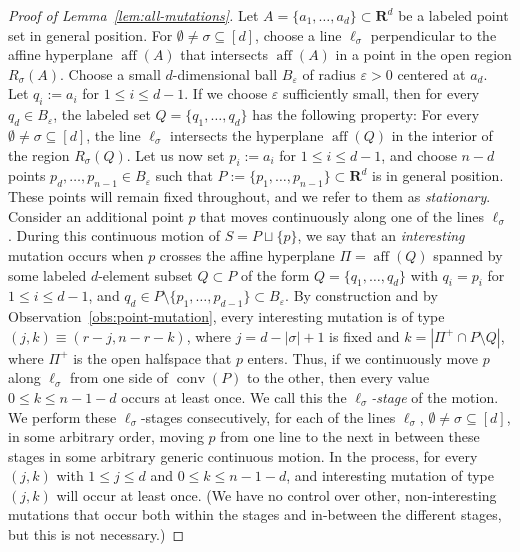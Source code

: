 \documentclass[11pt]{article}
\DeclareMathOperator{\conv}{conv}
\DeclareMathOperator{\aff}{aff}
\renewcommand{\leq}{\leqslant}
\newcommand{\R}{\mathbf{R}}
\begin{document}
\begin{proof}[Proof of Lemma~\ref{lem:all-mutations}] 
Let $A=\{a_1,\dots,a_d\} \subset \R^d$ be a labeled point set in general position. 
For $\emptyset \neq \sigma \subseteq [d]$, choose a line $\ell_\sigma$ perpendicular to the affine hyperplane $\aff(A)$ that intersects $\aff(A)$ in a point in the open region $R_\sigma(A)$. 
Choose a small $d$-dimensional ball $B_\varepsilon$ of radius $\varepsilon>0$ centered at $a_d$. Let $q_i:= a_i$ for $1\leq i\leq d-1$. If we choose $\varepsilon$ sufficiently small, then for every $q_d\in B_\varepsilon$, the labeled set 
$Q=\{q_1,\dots,q_d\}$ has the following property: For every $\emptyset \neq \sigma \subseteq [d]$, the line $\ell_\sigma$ intersects the hyperplane $\aff(Q)$ in the interior of the region $R_\sigma(Q)$.  
%
Let us now set $p_i:=a_i$ for $1\leq i \leq d-1$, and choose 
$n-d$ points $p_d,\dots,p_{n-1} \in B_{\varepsilon}$ such that $P:=\{p_1,\dots,p_{n-1}\} \subset \R^d$ is in general position. These points will remain fixed throughout, and we refer to them as \emph{stationary}. 
%
Consider an additional point $p$ that moves continuously along one of the lines $\ell_\sigma$. During this continuous motion of $S=P\sqcup\{p\}$, we say that an \emph{interesting} mutation occurs when $p$ crosses the affine hyperplane $\Pi=\aff(Q)$ spanned by some labeled $d$-element subset $Q\subset P$ of the form $Q=\{q_1,\dots,q_d\}$ with $q_i=p_i$ for $1\leq i\leq d-1$, and $q_d\in P\setminus \{p_1,\dots, p_{d-1}\} \subset B_{\varepsilon}$. By construction and by Observation~\ref{obs:point-mutation}, every interesting mutation is of type $(j,k)\equiv (r-j,n-r-k)$, where $j=d-|\sigma|+1$ is fixed and $k=|\Pi^+ \cap P\setminus Q|$, where $\Pi^+$ is the open halfspace that $p$ enters. Thus, if we continuously move  $p$ along $\ell_\sigma$ from one side of $\conv(P)$ to the other, then every value $0\leq k \leq n-1-d$ occurs at least once. We call this the \emph{$\ell_\sigma$-stage} of the motion. We perform these $\ell_\sigma$-stages consecutively, for each of the lines $\ell_\sigma$, $\emptyset \neq \sigma \subseteq [d]$, in some arbitrary order, moving $p$ from one line to the next in between these stages in some arbitrary generic continuous motion. In the process, for every $(j,k)$ with $1\leq j \leq d$ and $0\leq k \leq n-1-d$, and interesting mutation of type $(j,k)$ will occur at least once. (We have no control over other, non-interesting mutations that occur both within the stages and in-between the different stages, but this is not necessary.)
\end{proof}
%
%
%
\appendix
\end{document}
